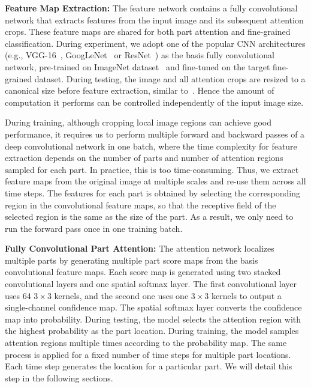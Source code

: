 \documentclass[10pt,twocolumn,letterpaper]{article}
\begin{document}
\textbf{Feature Map Extraction:}
The feature network contains a fully convolutional network that extracts features from the input image and its subsequent attention crops.
These feature maps are shared for both part attention and fine-grained classification.
During experiment, we adopt one of the popular CNN architectures (e.g., VGG-16~\cite{simonyan2014very}, GoogLeNet~\cite{szegedy2015going} or ResNet~\cite{he2016deep}) as the basis fully convolutional network, pre-trained on ImageNet dataset~\cite{wang2014object} and fine-tuned on the target fine-grained dataset.
During testing, the image and all attention crops are resized to a canonical size before feature extraction, similar to~\cite{mnih2014recurrent}.
Hence the amount of computation it performs can be controlled independently of the input image size.

During training, although cropping local image regions can achieve good performance, it requires us to perform multiple forward and backward passes of a deep convolutional network in one batch, where the time complexity for feature extraction depends on the number of parts and number of attention regions sampled for each part.
In practice, this is too time-consuming.
Thus, we extract feature maps from the original image at multiple scales and re-use them across all time steps.
The features for each part is obtained by selecting the corresponding region in the convolutional feature maps, so that the receptive field of the selected region is the same as the size of the part.
As a result, we only need to run the forward pass once in one training batch.

\textbf{Fully Convolutional Part Attention:}
The attention network localizes multiple parts by generating multiple part score maps from the basis convolutional feature maps.
Each score map is generated using two stacked convolutional layers and one spatial softmax layer.
The first convolutional layer uses 64 $3\times3$ kernels, and the second one uses one $3\times3$ kernels to output a single-channel confidence map.
The spatial softmax layer converts the confidence map into probability.
During testing, the model selects the attention region with the highest probability as the part location.
During training, the model samples attention regions multiple times according to the probability map.
The same process is applied for a fixed number of time steps for multiple part locations.
Each time step generates the location for a particular part.
We will detail this step in the following sections.
\end{document}
